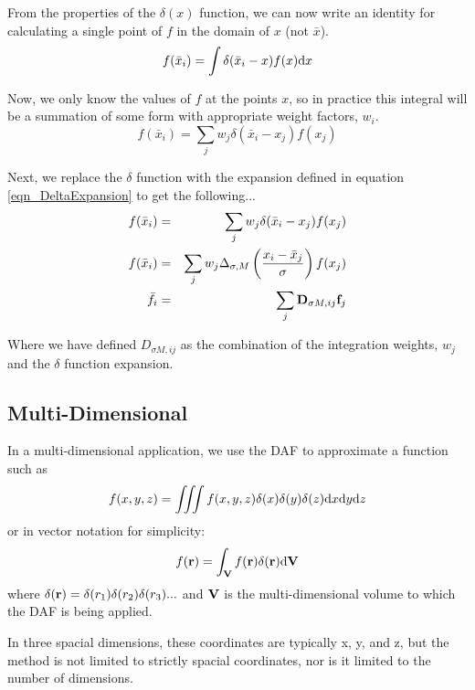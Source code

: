 \documentclass[preprint]{revtex4}
\begin{document}
From the properties of the $\delta(x)$ function, we can now write an identity for
calculating a single point of $f$ in the domain of $x$ (not $\bar{x}$). 
\begin{equation}
\label{eqn_fdelt_ident}
f(\bar{x}_i) = \int\delta(\bar{x}_i-x)f(x){\rm d}x
\end{equation}

Now, we only know the values of $f$ at the points $x$, so in practice this integral
will be a summation of some form with appropriate weight factors, $w_i$. 
\begin{equation}
\label{eqn_fdelt_sum}
f(\bar{x}_i) = \sum_j w_j \delta(\bar{x}_i-x_j)f(x_j)
\end{equation}

Next, we replace the $\delta$ function with the expansion defined in equation 
\ref{eqn_DeltaExpansion} to get the following...
\begin{eqnarray}
f(\bar{x}_i) &=& \sum_j w_j \delta(\bar{x}_i-x_j)f(x_j) \\
f(\bar{x}_i) &=& \sum_j w_j \Delta_{\sigma,M}\left(\frac{x_i-\bar{x}_j}{\sigma}\right)f(x_j) \\
\bar{f}_i & = &  \sum_j {\bf D}_{\sigma M,ij} {\bf f}_j
\end{eqnarray}

Where we have defined $D_{\sigma M, ij}$ as the combination of the integration weights, $w_j$ and 
the $\delta$ function expansion. 




\subsection{Multi-Dimensional}

In a multi-dimensional application, we use the DAF to approximate a function such as
\begin{equation}
f(x,y,z) = \iiint f(x,y,z)\delta(x)\delta(y)\delta(z) {\rm d}x {\rm d}y {\rm d}z
\end{equation}
or in vector notation for simplicity: 
\begin{equation}
f({\bf r}) = \int_{\bf V} f({\bf r})\delta({\bf r}){\rm d}{\bf V}
\end{equation}
where $\delta({\bf r}) = \delta(r_1)\delta(r_2)\delta(r_3)...$ and ${\bf V}$ is the
multi-dimensional volume to which the DAF is being applied. 

In three spacial dimensions, these coordinates are typically x, y, and z, but the method is
not limited to strictly spacial coordinates, nor is it limited to the number of
dimensions. 
\end{document}
